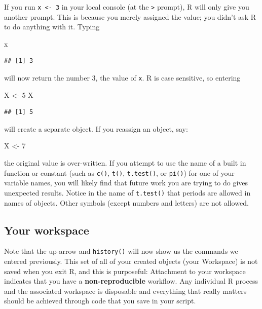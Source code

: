 \documentclass[
]{book}
\newenvironment{Shaded}{\begin{snugshade}}{\end{snugshade}}
\newcommand{\DecValTok}[1]{\textcolor[rgb]{0.00,0.00,0.81}{#1}}
\newcommand{\NormalTok}[1]{#1}
\newcommand{\OtherTok}[1]{\textcolor[rgb]{0.56,0.35,0.01}{#1}}
\begin{document}
If you run \texttt{x\ \textless{}-\ 3} in your local console (at the \texttt{\textgreater{}} prompt), R will only give you another prompt. This is because you merely assigned the value; you didn't ask R to do anything with it. Typing

\begin{Shaded}
\begin{Highlighting}[]
\NormalTok{x}
\end{Highlighting}
\end{Shaded}

\begin{verbatim}
## [1] 3
\end{verbatim}

will now return the number 3, the value of \texttt{x}. R is case sensitive, so entering

\begin{Shaded}
\begin{Highlighting}[]
\NormalTok{X }\OtherTok{\textless{}{-}} \DecValTok{5}
\NormalTok{X}
\end{Highlighting}
\end{Shaded}

\begin{verbatim}
## [1] 5
\end{verbatim}

will create a separate object. If you reassign an object, say:

\begin{Shaded}
\begin{Highlighting}[]
\NormalTok{X }\OtherTok{\textless{}{-}} \DecValTok{7}
\end{Highlighting}
\end{Shaded}

the original value is over-written. If you attempt to use the name of a built in function or constant (such as \texttt{c()}, \texttt{t()}, \texttt{t.test()}, or \texttt{pi()}) for one of your variable names, you will likely find that future work you are trying to do gives unexpected results. Notice in the name of \texttt{t.test()} that periods are allowed in names of objects. Other symbols (except numbers and letters) are not allowed.

\hypertarget{your-workspace}{%
\subsection*{Your workspace}\label{your-workspace}}

Note that the up-arrow and \texttt{history()} will now show us the commands we entered previously. This set of all of your created objects (your Workspace) is not saved when you exit R, and this is purposeful: Attachment to your workspace indicates that you have a \textbf{non-reproducible} workflow. Any individual R process and the associated workspace is disposable and everything that really matters should be achieved through code that you save in your script.
\end{document}
